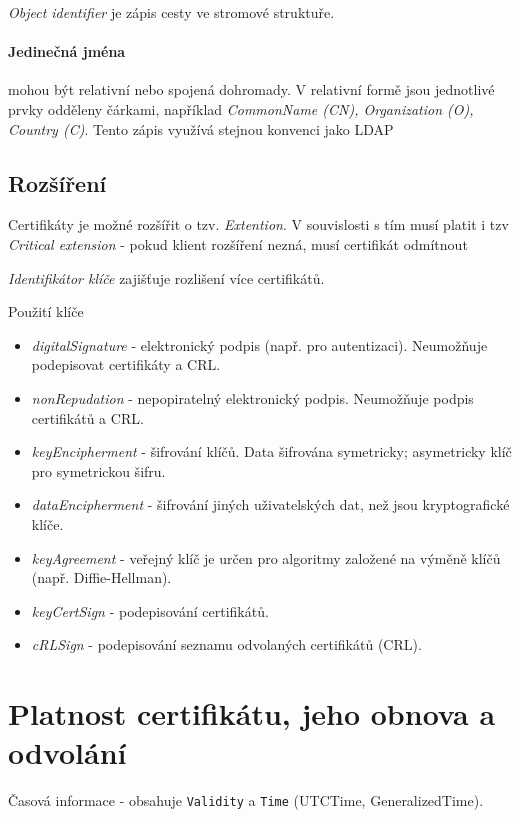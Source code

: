 \documentclass[10pt,a4paper]{article}
\begin{document}
\textit{Object identifier} je zápis cesty ve stromové struktuře. 

\paragraph{Jedinečná jména} mohou být relativní nebo spojená dohromady. 
V relativní formě jsou jednotlivé prvky odděleny čárkami, například \textit{CommonName (CN), Organization (O), Country (C)}. Tento zápis využívá stejnou konvenci jako LDAP


\subsection{Rozšíření}
Certifikáty je možné rozšířit o tzv. \textit{Extention}. 
V souvislosti s tím musí platit i tzv \textit{Critical extension} - pokud klient rozšíření nezná, musí certifikát odmítnout


\textit{Identifikátor klíče} zajišťuje rozlišení více certifikátů.


Použití klíče
\begin{itemize}\setlength\itemsep{0em}
	\item \textit{digitalSignature} - elektronický podpis (např. pro autentizaci). Neumožňuje podepisovat certifikáty a CRL.
	\item \textit{nonRepudation} - nepopiratelný elektronický podpis. Neumožňuje podpis certifikátů a CRL.
	\item \textit{keyEncipherment} - šifrování klíčů. Data šifrována symetricky; asymetricky klíč pro symetrickou šifru.
	\item \textit{dataEncipherment} - šifrování jiných uživatelských dat, než jsou kryptografické klíče.
	\item \textit{keyAgreement} - veřejný klíč je určen pro algoritmy založené na výměně klíčů (např. Diffie-Hellman).
	\item \textit{keyCertSign} - podepisování certifikátů.
	\item \textit{cRLSign} - podepisování seznamu odvolaných certifikátů (CRL).
\end{itemize}


\section{Platnost certifikátu, jeho obnova a odvolání}

Časová informace - obsahuje \texttt{Validity} a \texttt{Time} (UTCTime, GeneralizedTime). 
\end{document}
